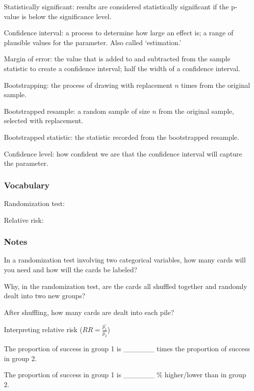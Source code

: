 \documentclass[
]{report}
\newcommand{\rgs}{\vspace{12pt}} %
\newcommand{\rgi}{\hspace{24pt}}  %
\begin{document}
Statistically significant: results are considered statistically significant if the p-value is below the significance level.

Confidence interval: a process to determine how large an effect is; a range of plausible values for the parameter. Also called `estimation.'

Margin of error: the value that is added to and subtracted from the sample statistic to create a confidence interval; half the width of a confidence interval.

Bootstrapping: the process of drawing with replacement \(n\) times from the original sample.

Bootstrapped resample: a random sample of size \(n\) from the original sample, selected with replacement.

Bootstrapped statistic: the statistic recorded from the bootstrapped resample.

Confidence level: how confident we are that the confidence interval will capture the parameter.

\hypertarget{vocabulary-16}{%
\subsubsection*{Vocabulary}\label{vocabulary-16}}

Randomization test:
\rgs

Relative risk:
\rgs

\hypertarget{notes-20}{%
\subsubsection*{Notes}\label{notes-20}}

In a randomization test involving two categorical variables, how many cards will you need and how will the cards be labeled?
\rgs

Why, in the randomization test, are the cards all shuffled together and randomly dealt into two new groups?
\rgs

After shuffling, how many cards are dealt into each pile?
\rgs

Interpreting relative risk (\(RR = \frac{\hat{p_1}}{\hat{p_2}}\))

\rgi The proportion of success in group 1 is \_\_\_\_\_\_ times the proportion of success in group 2.

\rgi The proportion of success in group 1 is \_\_\_\_\_\_ \% higher/lower than in group 2.
\end{document}
